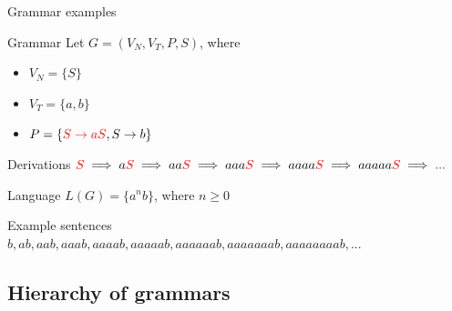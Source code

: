 \documentclass{beamer}
\begin{document}
\begin{frame}{Grammar examples}
	\begin{block}{Grammar}
		Let $G = (V_N, V_T, P, S)$, where 
		\begin{itemize}
			\item $V_N = \{S\}$
			\item $V_T = \{a,b\}$
			\item $P = \{\textcolor{red}{S \rightarrow aS}, S \rightarrow b\}$ %
		\end{itemize}
	\end{block}
	
	\begin{block}{Derivations}
		$\textcolor{red}{S}\implies a\textcolor{red}{S}\implies aa\textcolor{red}{S} \implies aaa\textcolor{red}{S} \implies aaaa\textcolor{red}{S} \implies aaaaa\textcolor{red}{S} \implies ...$
	\end{block}
	
	\begin{block}{Language}
		$L(G) = \{a^{n}b\}$, where $n \geq 0$
	\end{block}
	
	\begin{exampleblock}{Example sentences}
		$b, ab, aab, aaab, aaaab, aaaaab, aaaaaab, aaaaaaab, aaaaaaaab, ...$
	\end{exampleblock}
\end{frame}
 

\subsection{Hierarchy of grammars}
\end{document}
